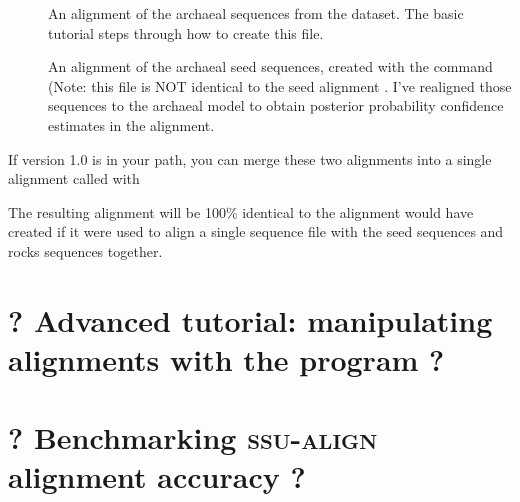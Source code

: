 \begin{description}
\item[]
  An alignment of the archaeal sequences from the 
  dataset. The basic tutorial steps through how to create this file.

\item[]
  An alignment of the archaeal seed sequences, created with the
  command 
  (Note: this file is NOT identical to the seed alignment
  . I've realigned those sequences to the
  archaeal model to obtain posterior probability confidence estimates
  in the alignment. 
\end{description}

If  version 1.0 is in your path, you 
can merge these two alignments into a single alignment called
 with


The resulting alignment will be 100\% identical to the alignment
 would have created if it were used to align a single
sequence file with the seed sequences and rocks sequences together.

\section{? Advanced tutorial: manipulating alignments with the
   program ?}
\section{? Benchmarking \textsc{ssu-align} alignment accuracy ?}


